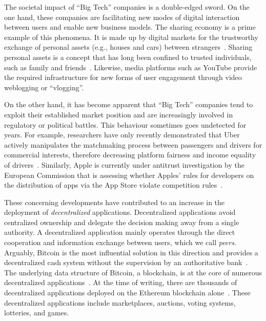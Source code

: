 The societal impact of \enquote{Big Tech} companies is a double-edged sword.
On the one hand, these companies are facilitating new modes of digital interaction between users and enable new business models.
The sharing economy is a prime example of this phenomena.
It is made up by digital markets for the trustworthy exchange of personal assets (e.g., houses and cars) between strangers~\cite{schor2016debating}.
Sharing personal assets is a concept that has long been confined to trusted individuals, such as family and friends~\cite{frenken2019putting}.
Likewise, media platforms such as YouTube provide the required infrastructure for new forms of user engagement through video weblogging or \enquote{vlogging}.

On the other hand, it has become apparent that \enquote{Big Tech} companies tend to exploit their established market position and are increasingly involved in regulatory or political battles.
This behaviour sometimes goes undetected for years.
For example, researchers have only recently demonstrated that Uber actively manipulates the matchmaking process between passengers and drivers for commercial interests, therefore decreasing platform fairness and income equality of drivers~\cite{bokanyi2019ride}.
Similarly, Apple is currently under antitrust investigation by the European Commission that is assessing whether Apples' rules for developers on the distribution of apps via the App Store violate competition rules~\cite{kotapati2020antitrust}.

These concerning developments have contributed to an increase in the deployment of \emph{decentralized} applications.
Decentralized applications avoid centralized ownership and delegate the decision making away from a single authority.
A decentralized application mainly operates through the direct cooperation and information exchange between users, which we call \emph{peers}.
Arguably, Bitcoin is the most influential solution in this direction and provides a decentralized cash system without the supervision by an authoritative bank~\cite{nakamoto2019bitcoin}.
The underlying data structure of Bitcoin, a blockchain, is at the core of numerous decentralized applications~\cite{bashir2018mastering}.
At the time of writing, there are thousands of decentralized applications deployed on the Ethereum blockchain alone~\cite{wood2014ethereum}.
These decentralized applications include marketplaces, auctions, voting systems, lotteries, and games.

